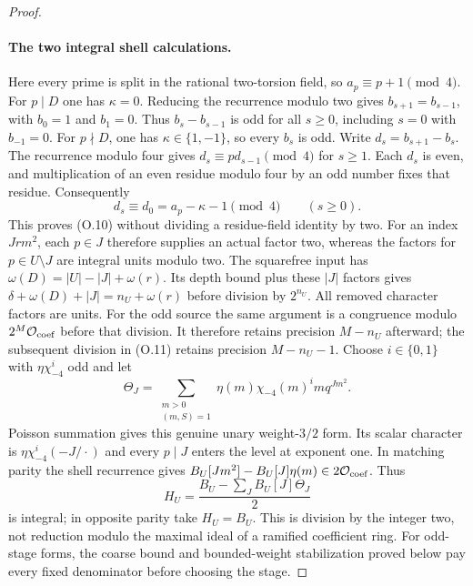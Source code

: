 \begin{proof}
\paragraph{The two integral shell calculations.}
Here every prime is split in the rational two-torsion field, so
$a_p\equiv p+1\pmod4$. For $p\mid D$ one has $\kappa=0$.
Reducing the recurrence modulo two gives $b_{s+1}=b_{s-1}$,
with $b_0=1$ and $b_1=0$. Thus $b_s-b_{s-1}$ is odd for
all $s\ge0$, including $s=0$ with $b_{-1}=0$.
For $p\nmid D$, one has $\kappa\in\{1,-1\}$, so every $b_s$
is odd. Write $d_s=b_{s+1}-b_s$. The recurrence modulo four gives
$d_s\equiv p d_{s-1}\pmod4$ for $s\ge1$.
Each $d_s$ is even, and multiplication of an even residue modulo
four by an odd number fixes that residue. Consequently
\[
 d_s\equiv d_0=a_p-\kappa-1\pmod4\qquad(s\ge0).
\]
This proves (O.10) without dividing a residue-field identity by two.
For an index $Jrm^2$, each $p\in J$ therefore supplies an actual
factor two, whereas the factors for $p\in U\setminus J$ are integral
units modulo two. The squarefree input has
$\omega(D)=|U|-|J|+\omega(r)$. Its depth bound plus these $|J|$
factors gives
$\delta+\omega(D)+|J|=n_U+\omega(r)$ before division by
$2^{n_U}$. All removed character factors are units.
For the odd source the same argument is a congruence modulo
$2^M\mathcal O_{\rm coef}$ before that division. It therefore
retains precision $M-n_U$ afterward; the subsequent division
in (O.11) retains precision $M-n_U-1$.
Choose $i\in\{0,1\}$ with $\eta\chi_{-4}^i$ odd and let
\[
 \Theta_J=\sum_{\substack{m>0\\(m,S)=1}}
                      \eta(m)\chi_{-4}(m)^i m q^{Jm^2}.
\]
Poisson summation gives this genuine unary weight-$3/2$ form.
Its scalar character is $\eta\chi_{-4}^i(-J/\cdot)$ and every
$p\mid J$ enters the level at exponent one.
In matching parity the shell recurrence gives
$B_U[Jm^2]-B_U[J]\eta(m)\in2\mathcal O_{\rm coef}$.
Thus
\[
                 H_U=\frac{B_U-\sum_JB_U[J]\Theta_J}{2}          \tag{O.11}
\]
is integral; in opposite parity take $H_U=B_U$.
This is division by the integer two, not reduction modulo the
maximal ideal of a ramified coefficient ring. For odd-stage
forms, the coarse bound and bounded-weight stabilization proved
below pay every fixed denominator before choosing the stage.


\end{proof}
